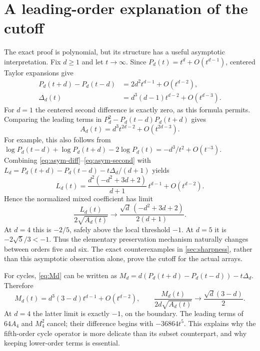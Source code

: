 \documentclass[11pt,a4paper]{article}
\numberwithin{equation}{section}
\theoremstyle{definition}
\theoremstyle{remark}
\begin{document}
\section{A leading-order explanation of the cutoff}\label{sec:asymptotics}

The exact proof is polynomial, but its structure has a useful asymptotic
interpretation. Fix $d\ge1$ and let $t\to\infty$. Since
$P_d(t)=t^d+O(t^{d-1})$, centered Taylor expansions give
\begin{align}
 P_d(t+d)-P_d(t-d)&=2d^2t^{d-1}+O(t^{d-2}),\label{eq:asym-diff}\\
 \Delta_d(t)&=d^3(d-1)t^{d-2}+O(t^{d-3}).\label{eq:asym-second}
\end{align}
For $d=1$ the centered second difference is exactly zero, as this formula
permits. Comparing the leading terms in $P_d^2-P_d(t-d)P_d(t+d)$ gives
\begin{equation}\label{eq:asym-A}
 A_d(t)=d^3t^{2d-2}+O(t^{2d-3}).
\end{equation}
For example, this also follows from
$\log P_d(t-d)+\log P_d(t+d)-2\log P_d(t)
=-d^3/t^2+O(t^{-3})$.
Combining \eqref{eq:asym-diff}--\eqref{eq:asym-second} with
$L_d=P_d(t+d)-P_d(t-d)-t\Delta_d/(d+1)$ yields
\begin{equation}\label{eq:asym-L}
 L_d(t)=\frac{d^2(-d^2+3d+2)}{d+1}\,t^{d-1}+O(t^{d-2}).
\end{equation}
Hence the normalized mixed coefficient has limit
\begin{equation}\label{eq:asym-subset-ratio}
 \frac{L_d(t)}{2\sqrt{A_d(t)}}
 \longrightarrow \frac{\sqrt d\,(-d^2+3d+2)}{2(d+1)}.
\end{equation}
At $d=4$ this is $-2/5$, safely above the local threshold $-1$.
At $d=5$ it is $-2\sqrt5/3<-1$. Thus the elementary preservation
mechanism naturally changes between orders five and six. The exact
counterexamples in \cref{sec:sharpness}, rather than this asymptotic
observation alone, prove the cutoff for the actual arrays.

For cycles, \eqref{eq:Md} can be written as
$M_d=d(P_d(t+d)-P_d(t-d))-t\Delta_d$. Therefore
\begin{equation}\label{eq:asym-M}
 M_d(t)=d^3(3-d)t^{d-1}+O(t^{d-2}),\qquad
 \frac{M_d(t)}{2d\sqrt{A_d(t)}}\longrightarrow
                         \frac{\sqrt d(3-d)}2.
\end{equation}
At $d=4$ the latter limit is exactly $-1$, on the boundary.
The leading terms of $64A_4$ and $M_4^2$ cancel; their difference begins
with $-36864t^5$. This explains why the fifth-order cycle operator is
more delicate than its subset counterpart, and why keeping lower-order
terms is essential.
\end{document}

